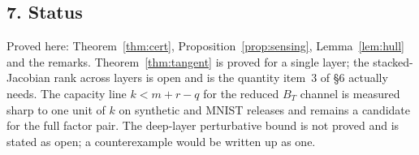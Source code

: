 \subsection*{7. Status}

Proved here: Theorem~\ref{thm:cert}, Proposition~\ref{prop:sensing}, Lemma~\ref{lem:hull} and the
remarks. Theorem~\ref{thm:tangent} is proved for a single layer; the stacked-Jacobian rank across
layers is open and is the quantity item~3 of \S6 actually needs. The capacity line $k<m+r-q$ for the
reduced $B_T$ channel is measured sharp to one unit of $k$ on synthetic and MNIST releases and
remains a candidate for the full factor pair. The deep-layer perturbative bound is not proved and is
stated as open; a counterexample would be written up as one.
